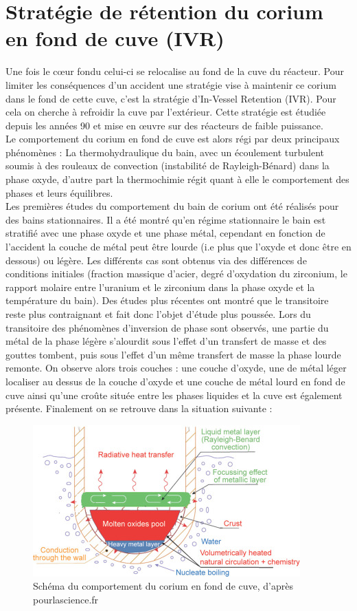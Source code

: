 \section{Stratégie de rétention du corium en fond de cuve (IVR)}
Une fois le c\oe ur fondu celui-ci se relocalise au fond de la cuve du réacteur. Pour limiter les conséquences d'un accident une stratégie vise à maintenir ce corium dans le fond de cette cuve, c'est la stratégie d'In-Vessel Retention (IVR). Pour cela on cherche à refroidir la cuve par l'extérieur. Cette stratégie est étudiée depuis les années 90 et mise en \oe uvre sur des réacteurs de faible puissance. \\
Le comportement du corium en fond de cuve est alors régi par deux principaux phénomènes :
La thermohydraulique du bain, avec un écoulement turbulent soumis à des rouleaux de convection (instabilité de Rayleigh-Bénard) dans la phase oxyde, d'autre part la thermochimie régit quant à elle le comportement des phases et leurs équilibres. \\
Les premières études du comportement du bain de corium ont été réalisés pour des bains stationnaires. Il a été montré qu'en régime stationnaire le bain est stratifié avec une phase oxyde et une phase métal, cependant en fonction de l'accident la couche de métal peut être lourde (i.e plus que l'oxyde et donc être en dessous) ou légère. Les différents cas sont obtenus via des différences de conditions initiales (fraction massique d'acier, degré d'oxydation du zirconium, le rapport molaire entre l'uranium et le zirconium dans la phase oxyde et la température du bain). Des études plus récentes ont montré que le transitoire reste plus contraignant et fait donc l'objet d'étude plus poussée. Lors du transitoire des phénomènes d'inversion de phase sont observés, une partie du métal de la phase légère s'alourdit sous l'effet d'un transfert de masse et des gouttes tombent, puis sous l'effet d'un même transfert de masse la phase lourde remonte. On observe alors trois couches : une couche d'oxyde, une de métal léger localiser au dessus de la couche d'oxyde et une couche de métal lourd en fond de cuve ainsi qu'une croûte située entre les phases liquides et la cuve est également présente. Finalement on se retrouve dans la situation suivante :
\begin{figure}[h!]
	\centering
	\includegraphics[width=0.6\linewidth]{figure/IVR_schema}
	\caption[Schéma du comportement du corium en fond de cuve]{Schéma du comportement du corium en fond de cuve, d'après pourlascience.fr}
	\label{fig:ivrschema}
\end{figure}\\

